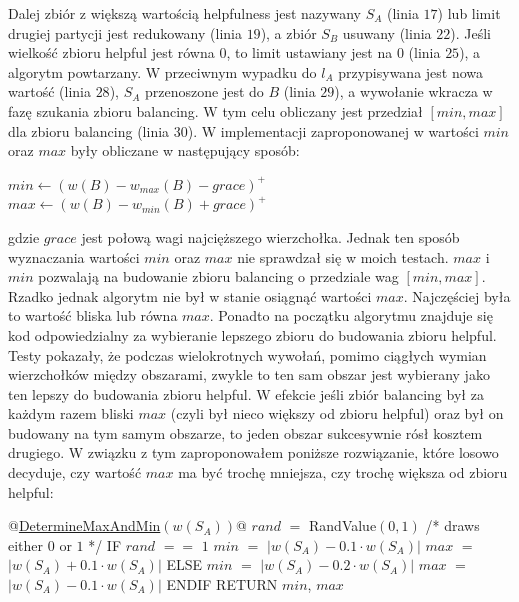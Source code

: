 Dalej zbiór z większą wartością helpfulness jest nazywany $S_A$ (linia $17$) lub limit
drugiej partycji jest redukowany (linia $19$), a zbiór $S_B$ usuwany (linia $22$).
Jeśli wielkość zbioru helpful jest równa $0$, to limit ustawiany jest na $0$ (linia $25$), a algorytm powtarzany.
W przeciwnym wypadku do $l_A$ przypisywana jest nowa wartość (linia $28$), $S_A$ przenoszone jest do $B$ (linia $29$),
a wywołanie wkracza w fazę szukania zbioru balancing.
W tym celu obliczany jest przedział $[min, max]$ dla zbioru balancing (linia $30$).
W implementacji zaproponowanej w \cite{1364754} wartości $min$ oraz $max$ były obliczane w następujący sposób:
\vspace{-3mm}
\begin{pseudocode}
$min \leftarrow (w(B) - w_{max}(B) - grace)^+$
$max \leftarrow (w(B) - w_{min}(B) + grace)^+$
\end{pseudocode}
\vspace{-13mm}
\label{code:old_min_max}
\vspace{3mm}
gdzie $grace$ jest połową wagi najcięższego wierzchołka.
Jednak ten sposób wyznaczania wartości $min$ oraz $max$ nie sprawdzał się w moich testach.
$max$ i $min$ pozwalają na budowanie zbioru balancing o przedziale wag $[min, max]$.
Rzadko jednak algorytm nie był w stanie osiągnąć wartości $max$.
Najczęściej była to wartość bliska lub równa $max$.
Ponadto na początku algorytmu znajduje się kod odpowiedzialny za wybieranie lepszego zbioru do budowania zbioru helpful.
Testy pokazały, że podczas wielokrotnych wywołań, pomimo ciągłych wymian wierzchołków między obszarami,
zwykle to ten sam obszar jest wybierany jako ten lepszy do budowania zbioru helpful.
W efekcie jeśli zbiór balancing był za każdym razem bliski $max$ (czyli był nieco większy od zbioru helpful) oraz
był on budowany na tym samym obszarze, to jeden obszar sukcesywnie rósł kosztem drugiego.
W związku z tym zaproponowałem poniższe rozwiązanie, które losowo decyduje, czy wartość $max$ ma być trochę mniejsza, czy
trochę większa od zbioru helpful:
\vspace{-3mm}
\begin{pseudocode}
@\underline{DetermineMaxAndMin$(w(S_A))$}@
  $rand$ $=$ RandValue$(0,1)$   /* draws either $0$ or $1$ */
  IF $rand$ $==$ $1$
    $min$ $=$ $| w(S_A) - 0.1 \cdot w(S_A) |$
    $max$ $=$ $| w(S_A) + 0.1 \cdot w(S_A) |$
  ELSE
    $min$ $=$ $| w(S_A) - 0.2 \cdot w(S_A) |$
    $max$ $=$ $| w(S_A) - 0.1 \cdot w(S_A) |$
  ENDIF
  RETURN $min$, $max$
\end{pseudocode}
\vspace{-13mm}
\label{code:new_min_max}
\FloatBarrier

